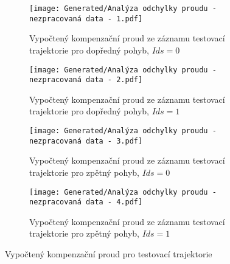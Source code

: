 \begin{landscapeimagepage}
    \begin{figure}[H]
        \centering
        \begin{subfigure}{.5\textheight}
            \centering
            \texttt{[image: Generated/Analýza odchylky proudu - nezpracovaná data - 1.pdf]}
            \caption{Vypočtený kompenzační proud ze záznamu testovací trajektorie pro dopředný pohyb, $Ids = 0$}
            \label{fig: Vypočtený kompenzační proud ze záznamu testovací trajektorie pro dopředný pohyb, Ids = 0 m}
        \end{subfigure}
        \vspace{0.5cm}
        \hspace{2.5cm}
        \begin{subfigure}{.5\textheight}
            \centering
            \texttt{[image: Generated/Analýza odchylky proudu - nezpracovaná data - 2.pdf]}
            \caption{Vypočtený kompenzační proud ze záznamu testovací trajektorie pro dopředný pohyb, $Ids = 1$}
            \label{fig: Vypočtený kompenzační proud ze záznamu testovací trajektorie pro dopředný pohyb, Ids = 1 m}
        \end{subfigure}
        \vspace{0.5cm}
        \begin{subfigure}{.5\textheight}
            \centering
            \texttt{[image: Generated/Analýza odchylky proudu - nezpracovaná data - 3.pdf]}
            \caption{Vypočtený kompenzační proud ze záznamu testovací trajektorie pro zpětný pohyb, $Ids = 0$}
            \label{fig: Vypočtený kompenzační proud ze záznamu testovací trajektorie pro zpětný pohyb, Ids = 0 m}
        \end{subfigure}
        \hspace{2.5cm}
        \begin{subfigure}{.5\textheight}
            \centering
            \texttt{[image: Generated/Analýza odchylky proudu - nezpracovaná data - 4.pdf]}
            \caption{Vypočtený kompenzační proud ze záznamu testovací trajektorie pro zpětný pohyb, $Ids = 1$}
            \label{fig: Vypočtený kompenzační proud ze záznamu testovací trajektorie pro zpětný pohyb, Ids = 1 m}
        \end{subfigure}
        \caption{Vypočtený kompenzační proud pro testovací trajektorie}
        \label{}
    \end{figure}
\end{landscapeimagepage}


